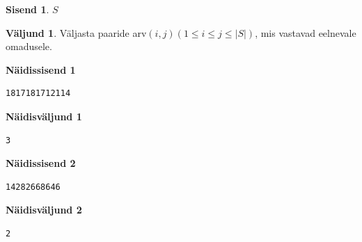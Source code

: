 \documentclass{trkut}
\theoremstyle{definition}
\newtheorem*{Input}{Sisend}
\newtheorem*{Output}{Väljund}
\begin{document}
\begin{Input}
$S$
\end{Input}

\begin{Output}
Väljasta paaride arv$(i,j)$$(1\le i\le j\le |S|)$, mis vastavad eelnevale omadusele.
\end{Output}

\textbf{Näidissisend 1}

\begin{verbatim}
1817181712114
\end{verbatim}

\textbf{Näidisväljund 1}

\begin{verbatim}
3
\end{verbatim}





\textbf{Näidissisend 2}

\begin{verbatim}
14282668646
\end{verbatim}

\textbf{Näidisväljund 2}

\begin{verbatim}
2
\end{verbatim}
\end{document}
